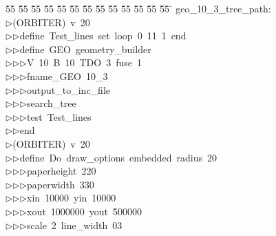 %
%
\begin{tabbing}
55 \= 55 \= 55 \= 55 \= 55 \= 55 \= 55 \= 55 \= 55 \= 55 \= 55 \= 55 \= 55 \= \kill
geo\_10\_3\_tree\_path:\\[0pt]
$\triangleright$\>(ORBITER)\ v\ 20\ \\[0pt]
$\triangleright$\>$\triangleright$\>define\ Test\_lines\ set\ loop\ 0\ 11\ 1\ end\ \\[0pt]
$\triangleright$\>$\triangleright$\>define\ GEO\ geometry\_builder\ \\[0pt]
$\triangleright$\>$\triangleright$\>$\triangleright$\>V\ 10\ B\ 10\ TDO\ 3\ fuse\ 1\ \\[0pt]
$\triangleright$\>$\triangleright$\>$\triangleright$\>fname\_GEO\ 10\_3\ \\[0pt]
$\triangleright$\>$\triangleright$\>$\triangleright$\>output\_to\_inc\_file\ \\[0pt]
$\triangleright$\>$\triangleright$\>$\triangleright$\>search\_tree\ \\[0pt]
$\triangleright$\>$\triangleright$\>$\triangleright$\>test\ Test\_lines\ \\[0pt]
$\triangleright$\>$\triangleright$\>end\\[0pt]
$\triangleright$\>(ORBITER)\ v\ 20\ \\[0pt]
$\triangleright$\>$\triangleright$\>define\ Do\ draw\_options\ embedded\ radius\ 20\ \\[0pt]
$\triangleright$\>$\triangleright$\>$\triangleright$\>paperheight\ 220\ \\[0pt]
$\triangleright$\>$\triangleright$\>$\triangleright$\>paperwidth\ 330\ \\[0pt]
$\triangleright$\>$\triangleright$\>$\triangleright$\>xin\ 10000\ yin\ 10000\ \\[0pt]
$\triangleright$\>$\triangleright$\>$\triangleright$\>xout\ 1000000\ yout\ 500000\ \\[0pt]
$\triangleright$\>$\triangleright$\>$\triangleright$\>scale\ 2\ line\_width\ 03\ \\[0pt]

\end{tabbing}
